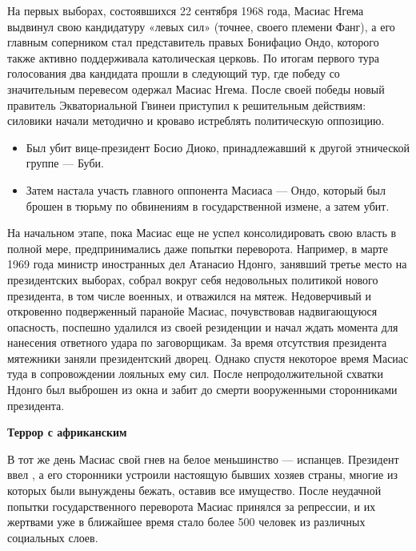 На первых выборах, состоявшихся 22 сентября 1968 года, Масиас Нгема выдвинул свою кандидатуру  «левых сил» (точнее, своего племени Фанг), а его главным соперником стал представитель правых Бонифацио Ондо, которого также активно поддерживала католическая церковь. По итогам первого тура голосования два кандидата прошли в следующий тур, где победу со значительным перевесом одержал Масиас Нгема. После своей победы новый правитель Экваториальной Гвинеи  приступил к решительным действиям: силовики начали методично и кроваво истреблять политическую оппозицию.

\begin{itemize}
    \item Был убит вице-президент Босио Диоко, принадлежавший к другой этнической группе --- Буби.
    \item Затем настала участь главного оппонента Масиаса --- Ондо, который был брошен в тюрьму по обвинениям в государственной измене, а затем убит.
\end{itemize}

На начальном этапе, пока Масиас еще не успел консолидировать свою власть в полной мере, предпринимались даже попытки переворота. Например, в марте 1969 года министр иностранных дел Атанасио Ндонго, занявший третье место на президентских выборах, собрал вокруг себя недовольных политикой нового президента, в том числе военных, и отважился на мятеж. Недоверчивый и откровенно подверженный паранойе Масиас, почувствовав надвигающуюся опасность, поспешно удалился из своей резиденции и начал ждать момента для нанесения ответного удара по заговорщикам. За время отсутствия президента мятежники заняли президентский дворец. Однако спустя некоторое время Масиас  туда в сопровождении лояльных ему сил. После непродолжительной схватки Ндонго был выброшен из окна и забит до смерти вооруженными сторонниками президента.


\textbf{Террор с африканским }

В тот же день Масиас  свой гнев на белое меньшинство --- испанцев. Президент ввел , а его сторонники устроили настоящую  бывших хозяев страны, многие из которых были вынуждены бежать, оставив все имущество. После неудачной попытки государственного переворота Масиас принялся за репрессии, и их жертвами уже в ближайшее время стало более 500 человек из различных социальных слоев.

